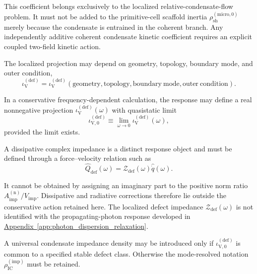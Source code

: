 This coefficient belongs exclusively to the localized relative-condensate-flow problem. It must not be added to the primitive-cell scaffold inertia $\rho_{\mathrm{sh}}^{(\mathrm{micro},0)}$ merely because the condensate is entrained in the coherent branch. Any independently additive coherent condensate kinetic coefficient requires an explicit coupled two-field kinetic action.

The localized projection may depend on geometry, topology, boundary mode, and outer condition,
\begin{equation}
    \iota_{\mathrm{V}}^{(\mathrm{def})}
    =
    \iota_{\mathrm{V}}^{(\mathrm{def})}
    \left(
        \mathrm{geometry},
        \mathrm{topology},
        \mathrm{boundary\ mode},
        \mathrm{outer\ condition}
    \right).
\end{equation}

In a conservative frequency-dependent calculation, the response may define a real nonnegative projection $\iota_{\mathrm{V}}^{(\mathrm{def})}(\omega)$ with quasistatic limit
\begin{equation}
    \iota_{\mathrm{V},0}^{(\mathrm{def})}
    \equiv
    \lim_{\omega\rightarrow0}
    \iota_{\mathrm{V}}^{(\mathrm{def})}(\omega),
\end{equation}
provided the limit exists.

A dissipative complex impedance is a distinct response object and must be defined through a force--velocity relation such as
\begin{equation}
    \widehat{Q}_{\mathrm{def}}(\omega)
    =
    \mathcal{Z}_{\mathrm{def}}(\omega)
    \widehat{\dot{q}}(\omega).
\end{equation}

It cannot be obtained by assigning an imaginary part to the positive norm ratio $A_{\mathrm{imp}}^{(\mathrm{n})}/V_{\mathrm{imp}}$. Dissipative and radiative corrections therefore lie outside the conservative action retained here. The localized defect impedance $\mathcal{Z}_{\mathrm{def}}(\omega)$ is not identified with the propagating-photon response developed in \hyperref[app:photon_dispersion_relaxation]{Appendix~\ref*{app:photon_dispersion_relaxation}}.

A universal condensate impedance density may be introduced only if $\iota_{\mathrm{V},0}^{(\mathrm{def})}$ is common to a specified stable defect class. Otherwise the mode-resolved notation $\rho_{\mathrm{IC}}^{(\mathrm{imp})}$ must be retained.


